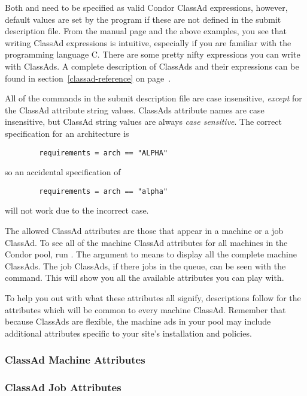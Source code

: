 Both  and  need to be specified 
as valid Condor ClassAd expressions, however, default values are set by the
 program if these are not defined in the submit description file.
From the  manual page and the above examples, you see
that writing ClassAd expressions is intuitive, especially if you
are familiar with the programming language C.  There are some
pretty nifty expressions you can write with ClassAds.
A complete description of ClassAds and their expressions
can be found in section~\ref{classad-reference} on 
page~\pageref{classad-reference}.

All of the commands in the submit description file are case insensitive, 
\emph{except} for the ClassAd attribute string values.
ClassAds attribute names are
case insensitive, but ClassAd string
values are always \emph{case sensitive}.
The correct specification for an architecture is
\begin{verbatim}
        requirements = arch == "ALPHA"
\end{verbatim}
so an accidental specification of
\begin{verbatim}
        requirements = arch == "alpha"
\end{verbatim}
will not work due to the incorrect case.

The allowed
ClassAd attributes are those 
that appear in a machine or a job ClassAd.
To see all of the machine ClassAd attributes for all machines in
the Condor pool, run .  
The  argument to
 means to display all the complete machine ClassAds.
The job ClassAds, if there jobs in the queue, can be seen
with the  command.
This
will show you all the available attributes you can play with.

To help you out with what these attributes all signify,
descriptions follow for the attributes which will be common to every
machine ClassAd. Remember that because ClassAds are flexible, the
machine ads in your pool may include additional attributes specific
to your site's installation and policies. 

\subsubsection{\label{user-man-machad}ClassAd Machine Attributes}


\subsubsection{\label{user-man-jobad}ClassAd Job Attributes}


